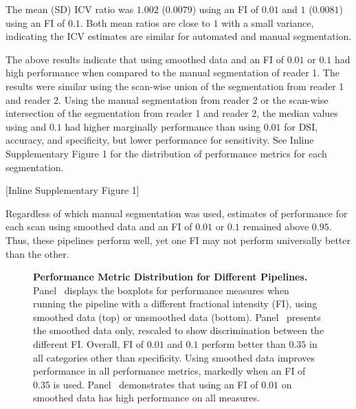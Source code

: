 \documentclass{elsarticle}\usepackage[]{graphicx}\usepackage[]{color}
\begin{document}
The mean (SD) ICV ratio was $1.002$ ($0.0079$) using an FI of $0.01$ and $1$ ($0.0081$) using an FI of $0.1$.  Both mean ratios are close to $1$ with a small variance, indicating the ICV estimates are similar for automated and manual segmentation. 

The above results indicate that using smoothed data and an FI of $0.01$ or $0.1$ had high performance when compared to the manual segmentation of reader 1.  The results were similar using the scan-wise union of the segmentation from reader 1 and reader 2.  Using the manual segmentation from reader 2 or the scan-wise intersection of the segmentation from reader 1 and reader 2, the median values using and $0.1$ had higher marginally performance than using $0.01$ for DSI, accuracy, and specificity, but lower performance for sensitivity.  See Inline Supplementary Figure 1 for the distribution of performance metrics for each segmentation.

[Inline Supplementary Figure 1]

Regardless of which manual segmentation was used, estimates of performance for each scan using smoothed data and an FI of $0.01$ or $0.1$ remained above $0.95$.  Thus, these pipelines perform well, yet one FI may not perform universally better than the other.  

% 
% 












\begin{figure}
\hfill
\caption{{\bf Performance Metric Distribution for Different Pipelines.} Panel~\protect{} displays the boxplots for performance measures when running the pipeline with a different fractional intensity (FI), using smoothed data (top) or unsmoothed data (bottom).  Panel~\protect{} presents the smoothed data only, rescaled to show discrimination between the different FI. Overall, FI of $0.01$ and $0.1$ perform better than $0.35$ in all categories other than specificity.  Using smoothed data improves performance in all performance metrics, markedly when an FI of $0.35$ is used.  Panel~\protect{} demonstrates that using an FI of $0.01$ on smoothed data has high performance on all measures.  }
\label{fig:metrics}
\end{figure}
\end{document}
